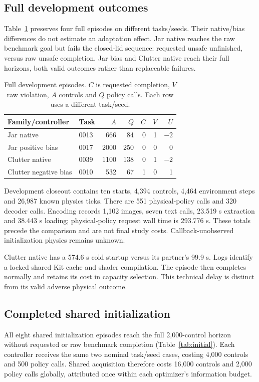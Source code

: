\documentclass[sigconf,dvipsnames,balance=false]{acmart}
\begin{document}
\subsection{Full development outcomes}
Table~\ref{tab:development} preserves four full episodes on different tasks/seeds.
Their native/bias differences do not estimate an adaptation effect. Jar native
reaches the raw benchmark goal but fails the closed-lid sequence: requested unsafe
unfinished, versus raw unsafe completion. Jar bias and Clutter native reach their
full horizons, both valid outcomes rather than replaceable failures.

\begin{table}[t]
\caption{Full development episodes. $C$ is requested completion, $V$ raw
violation, $A$ controls and $Q$ policy calls. Each row uses a different task/seed.}
\label{tab:development}
\begin{tabular}{llrrrrr}
\toprule
Family/controller & Task & $A$ & $Q$ & $C$ & $V$ & $U$ \\
\midrule
Jar native & 0013 & 666 & 84 & 0 & 1 & $-2$ \\
Jar positive bias & 0017 & 2000 & 250 & 0 & 0 & 0 \\
Clutter native & 0039 & 1100 & 138 & 0 & 1 & $-2$ \\
Clutter negative bias & 0010 & 532 & 67 & 1 & 0 & 1 \\
\bottomrule
\end{tabular}
\end{table}

Development closeout contains ten starts, 4,394 controls, 4,464 environment steps
and 26,987 known physics ticks. There are 551 physical-policy calls and 320 decoder
calls. Encoding records 1,102 images, seven text calls, 23.519 s extraction and
38.443 s loading; physical-policy request wall time is 293.776 s. These totals
precede the comparison and are not final study costs. Callback-unobserved
initialization physics remains unknown.

Clutter native has a 574.6 s cold startup versus its partner's 99.9 s. Logs identify
a locked shared Kit cache and shader compilation. The episode then completes
normally and retains its cost in capacity selection. This technical delay is
distinct from its valid adverse physical outcome.

\subsection{Completed shared initialization}
All eight shared initialization episodes reach the full 2,000-control horizon
without requested or raw benchmark completion (Table~\ref{tab:initial}). Each
controller receives the same two nominal task/seed cases, costing 4,000 controls
and 500 policy calls. Shared acquisition therefore costs 16,000 controls and 2,000
policy calls globally, attributed once within each optimizer's information budget.
\end{document}
